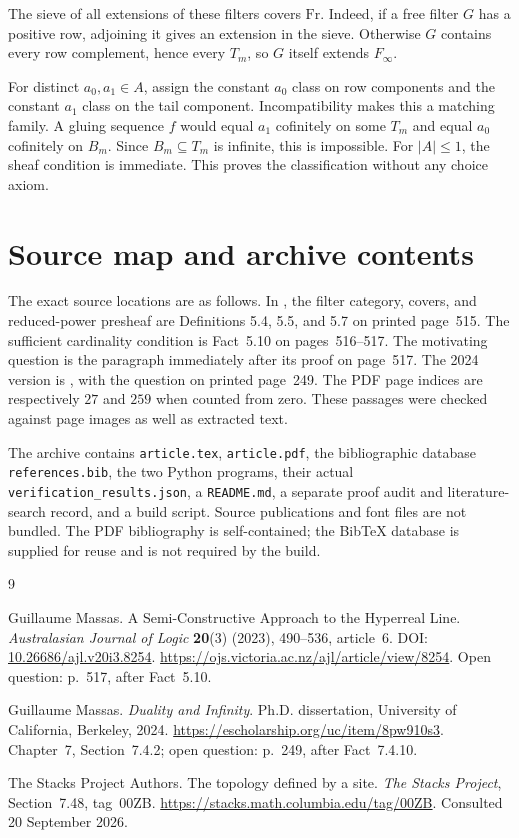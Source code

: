 \documentclass[11pt,letterpaper]{article}
\theoremstyle{definition}
\theoremstyle{remark}
\newcommand{\Fr}{\mathrm{Fr}}
\begin{document}
The sieve of all extensions of these filters covers $\Fr$. Indeed,
if a free filter $G$ has a positive row, adjoining it gives an
extension in the sieve. Otherwise $G$ contains every row complement,
hence every $T_m$, so $G$ itself extends $F_\infty$.

For distinct $a_0,a_1\in A$, assign the constant $a_0$ class on row
components and the constant $a_1$ class on the tail component.
Incompatibility makes this a matching family. A gluing sequence $f$
would equal $a_1$ cofinitely on some $T_m$ and equal $a_0$ cofinitely
on $B_m$. Since $B_m\subseteq T_m$ is infinite, this is impossible.
For $|A|\leq1$, the sheaf condition is immediate. This proves the
classification without any choice axiom.

\section{Source map and archive contents}
\label{app:sources}
The exact source locations are as follows. In \cite{Massas2023}, the
filter category, covers, and reduced-power presheaf are Definitions
5.4, 5.5, and 5.7 on printed page~515. The sufficient cardinality
condition is Fact~5.10 on pages~516--517. The motivating question is
the paragraph immediately after its proof on page~517. The 2024
version is \cite[Section 7.4.2, Fact 7.4.10 and following paragraph]{Massas2024},
with the question on printed page~249. The PDF page indices are
respectively $27$ and $259$ when counted from zero. These passages
were checked against page images as well as extracted text.

The archive contains \texttt{article.tex}, \texttt{article.pdf}, the
bibliographic database \texttt{references.bib}, the two Python
programs, their actual \texttt{verification\_results.json}, a
\texttt{README.md}, a separate proof audit and literature-search record,
and a build script. Source publications and font files are not bundled.
The PDF bibliography is self-contained; the BibTeX database is supplied
for reuse and is not required by the build.

\begin{thebibliography}{9}
Guillaume Massas.
\newblock A Semi-Constructive Approach to the Hyperreal Line.
\newblock \emph{Australasian Journal of Logic} \textbf{20}(3) (2023),
490--536, article~6.
\newblock DOI: \href{https://doi.org/10.26686/ajl.v20i3.8254}{10.26686/ajl.v20i3.8254}.
\newblock \url{https://ojs.victoria.ac.nz/ajl/article/view/8254}.
\newblock Open question: p.~517, after Fact~5.10.

Guillaume Massas.
\newblock \emph{Duality and Infinity}.
\newblock Ph.D. dissertation, University of California, Berkeley, 2024.
\newblock \url{https://escholarship.org/uc/item/8pw910s3}.
\newblock Chapter~7, Section~7.4.2; open question: p.~249, after
Fact~7.4.10.

The Stacks Project Authors.
\newblock The topology defined by a site.
\newblock \emph{The Stacks Project}, Section~7.48, tag~00ZB.
\newblock \url{https://stacks.math.columbia.edu/tag/00ZB}.
\newblock Consulted 20 September 2026.
\end{thebibliography}
\end{document}
